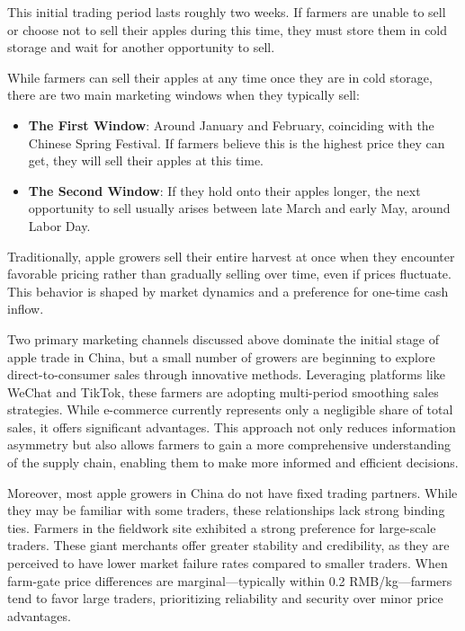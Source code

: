 This initial trading period lasts roughly two weeks. If farmers are unable to sell or choose not to sell their apples during this time, they must store them in cold storage and wait for another opportunity to sell.

While farmers can sell their apples at any time once they are in cold storage, there are two main marketing windows when they typically sell:

\begin{itemize}
    \item \textbf{The First Window}: Around January and February, coinciding with the Chinese Spring Festival. If farmers believe this is the highest price they can get, they will sell their apples at this time.
    \item \textbf{The Second Window}: If they hold onto their apples longer, the next opportunity to sell usually arises between late March and early May, around Labor Day.
\end{itemize}

Traditionally, apple growers sell their entire harvest at once when they encounter favorable pricing rather than gradually selling over time, even if prices fluctuate. This behavior is shaped by market dynamics and a preference for one-time cash inflow.

Two primary marketing channels discussed above dominate the initial stage of apple trade in China, but a small number of growers are beginning to explore direct-to-consumer sales through innovative methods. Leveraging platforms like WeChat and TikTok, these farmers are adopting multi-period smoothing sales strategies. While e-commerce currently represents only a negligible share of total sales, it offers significant advantages. This approach not only reduces information asymmetry but also allows farmers to gain a more comprehensive understanding of the supply chain, enabling them to make more informed and efficient decisions.


Moreover, most apple growers in China do not have fixed trading partners. While they may be familiar with some traders, these relationships lack strong binding ties. Farmers in the fieldwork site exhibited a strong preference for large-scale traders. These giant merchants offer greater stability and credibility, as they are perceived to have lower market failure rates compared to smaller traders. When farm-gate price differences are marginal—typically within 0.2 RMB/kg—farmers tend to favor large traders, prioritizing reliability and security over minor price advantages.




